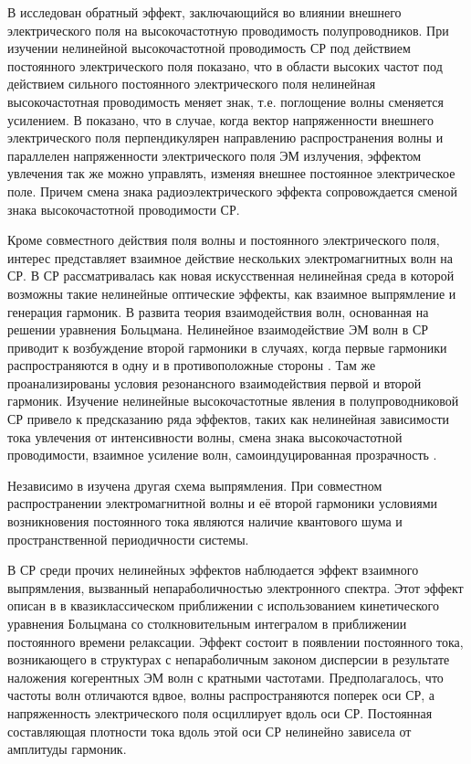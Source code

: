 В \cite{pavlovich} исследован обратный эффект, заключающийся во влиянии внешнего электрического поля на высокочастотную проводимость полупроводников. При изучении нелинейной высокочастотной проводимость СР под действием постоянного электрического поля показано, что в области высоких частот под действием сильного постоянного электрического поля нелинейная высокочастотная проводимость меняет знак, т.е. поглощение волны сменяется усилением. В \cite{sivashova} показано, что в случае, когда вектор напряженности внешнего электрического поля перпендикулярен направлению распространения волны и параллелен напряженности электрического поля ЭМ излучения, эффектом увлечения так же можно управлять, изменяя внешнее постоянное электрическое поле. Причем смена знака радиоэлектрического эффекта сопровождается сменой знака высокочастотной проводимости СР.

Кроме совместного действия поля волны и постоянного электрического поля, интерес представляет взаимное действие нескольких электромагнитных волн на СР. В \cite{esaki} СР рассматривалась как новая искусственная нелинейная среда в которой возможны такие нелинейные оптические эффекты, как взаимное выпрямление и генерация гармоник. В \cite{bass} развита теория взаимодействия волн, основанная на решении уравнения Больцмана. Нелинейное взаимодействие ЭМ волн в СР приводит к возбуждение второй гармоники в случаях, когда первые гармоники распространяются в одну и в противоположные стороны \cite{bulgakov}. Там же проанализированы условия резонансного взаимодействия первой и второй гармоник. Изучение нелинейные высокочастотные явления в полупроводниковой СР привело к предсказанию ряда эффектов, таких как нелинейная зависимости тока увлечения от интенсивности волны, смена знака высокочастотной проводимости, взаимное усиление волн, самоиндуцированная прозрачность \cite{kechiev}.

Независимо в \cite{goychuk} изучена другая схема выпрямления. При совместном распространении электромагнитной волны и её второй гармоники условиями возникновения постоянного тока являются наличие квантового шума и пространственной периодичности системы.

В СР среди прочих нелинейных эффектов наблюдается эффект взаимного выпрямления, вызванный непараболичностью электронного спектра. Этот эффект описан в \cite{mensah} в квазиклассическом приближении с использованием кинетического уравнения Больцмана со столкновительным интегралом в приближении постоянного времени релаксации. Эффект состоит в появлении постоянного тока, возникающего в структурах с непараболичным законом дисперсии в результате наложения когерентных ЭМ волн с кратными частотами. Предполагалось, что частоты волн отличаются вдвое, волны распространяются поперек оси СР, а напряженность электрического поля осциллирует вдоль оси СР. Постоянная составляющая плотности тока вдоль этой оси СР нелинейно зависела от амплитуды гармоник.

